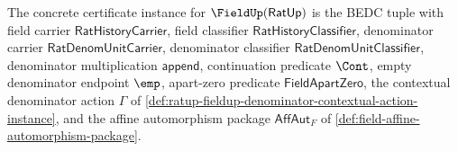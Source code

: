 \begin{definition}
\label{def:concrete-ratup-fieldup-certificate-instance}
The concrete certificate instance for $\FieldUp(\mathsf{RatUp})$ is the BEDC
tuple with field carrier $\mathsf{RatHistoryCarrier}$, field classifier
$\mathsf{RatHistoryClassifier}$, denominator carrier
$\mathsf{RatDenomUnitCarrier}$, denominator classifier
$\mathsf{RatDenomUnitClassifier}$, denominator multiplication
$\mathsf{append}$, continuation predicate $\Cont$, empty denominator endpoint
$\emp$, apart-zero predicate $\mathsf{FieldApartZero}$, the contextual
denominator action $\Gamma$ of
\autoref{def:ratup-fieldup-denominator-contextual-action-instance}, and the
affine automorphism package $\mathsf{AffAut}_F$ of
\autoref{def:field-affine-automorphism-package}.


\end{definition}
